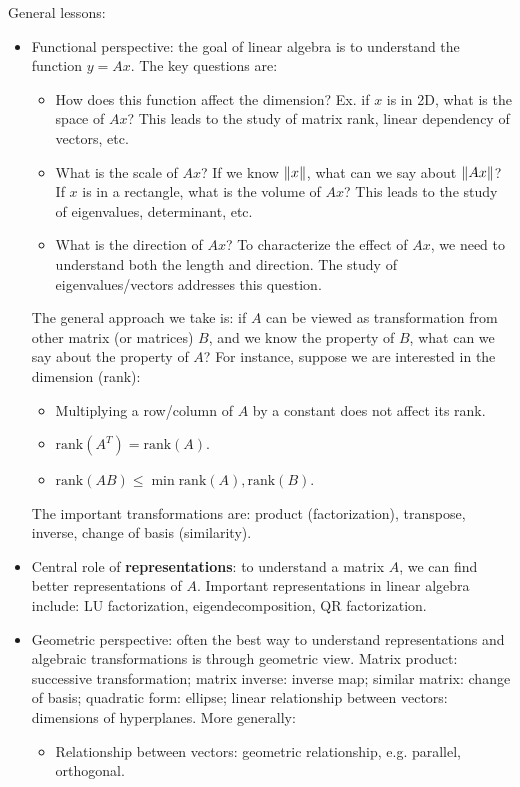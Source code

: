 \documentclass{report}
\begin{document}
General lessons: 
\begin{itemize}
	\item Functional perspective: the goal of linear algebra is to understand the function $y = Ax$. The key questions are: 
	\begin{itemize}
		\item How does this function affect the dimension? Ex. if $x$ is in 2D, what is the space of $Ax$? This leads to the study of matrix rank, linear dependency of vectors, etc. 
		
		\item What is the scale of $Ax$? If we know $\lVert x\rVert$, what can we say about $\lVert Ax\rVert$? If $x$ is in a rectangle, what is the volume of $Ax$? This leads to the study of eigenvalues, determinant, etc. 
		
		\item What is the direction of $Ax$? To characterize the effect of $Ax$, we need to understand both the length and direction. The study of eigenvalues/vectors addresses this question.   
	\end{itemize}
	The general approach we take is: if $A$ can be viewed as transformation from other matrix (or matrices) $B$, and we know the property of $B$, what can we say about the property of $A$? For instance, suppose we are interested in the dimension (rank): 
	\begin{itemize}
		\item Multiplying a row/column of $A$ by a constant does not affect its rank. 
		
		\item $\text{rank}(A^T) = \text{rank}(A)$. 
		
		\item $\text{rank}(AB) \leq \min{\text{rank}(A), \text{rank}(B)}$. 
	\end{itemize} 
	The important transformations are: product (factorization), transpose, inverse, change of basis (similarity). 
	
	\item Central role of \textbf{representations}: to understand a matrix $A$, we can find better representations of $A$. Important representations in linear algebra include: LU factorization, eigendecomposition, QR factorization. 
	
	\item Geometric perspective: often the best way to understand representations and algebraic transformations is through geometric view. Matrix product: successive transformation; matrix inverse: inverse map; similar matrix: change of basis; quadratic form: ellipse; linear relationship between vectors: dimensions of hyperplanes. More generally: 
	\begin{itemize}
		\item Relationship between vectors: geometric relationship, e.g. parallel, orthogonal. 
		

\end{itemize}
\end{itemize}
\end{document}
